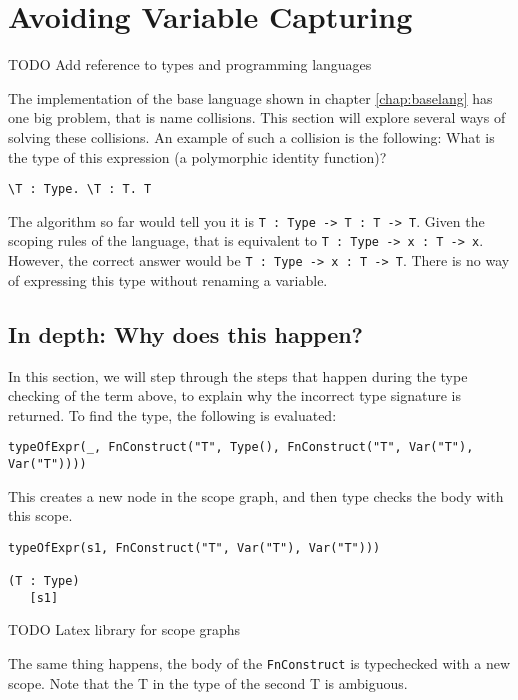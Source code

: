 
\chapter{\label{chap:namecolls}Avoiding Variable Capturing}

TODO Add reference to types and programming languages

The implementation of the base language shown in chapter \ref{chap:baselang} has one big problem, that is name collisions. This section will explore several ways of solving these collisions. An example of such a collision is the following: What is the type of this expression (a polymorphic identity function)?
\begin{lstlisting}
\T : Type. \T : T. T
\end{lstlisting}

The algorithm so far would tell you it is \verb|T : Type -> T : T -> T|. Given the scoping rules of the language, that is equivalent to \verb|T : Type -> x : T -> x|. However, the correct answer would be \verb|T : Type -> x : T -> T|. There is no way of expressing this type without renaming a variable.

\section{In depth: Why does this happen?}

In this section, we will step through the steps that happen during the type checking of the term above, to explain why the incorrect type signature is returned. To find the type, the following is evaluated:

\begin{lstlisting}
typeOfExpr(_, FnConstruct("T", Type(), FnConstruct("T", Var("T"), Var("T"))))
\end{lstlisting}

\noindent
This creates a new node in the scope graph, and then type checks the body with this scope.

\begin{lstlisting}
typeOfExpr(s1, FnConstruct("T", Var("T"), Var("T")))

(T : Type)
   [s1]
\end{lstlisting}
TODO Latex library for scope graphs

\noindent
The same thing happens, the body of the \verb|FnConstruct| is typechecked with a new scope. Note that the T in the type of the second T is ambiguous.

